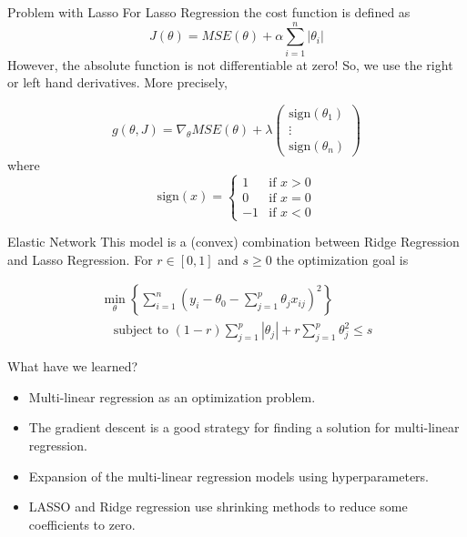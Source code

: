 \documentclass{beamer}
\begin{document}
\begin{frame}{Problem with Lasso}
For Lasso Regression the cost function is defined as
\begin{equation*}
	J(\theta)=MSE(\theta)+\alpha\sum_{i=1}^n |\theta_i|
\end{equation*}
However, the absolute function is not differentiable at zero! So, we use the right or left hand derivatives. More precisely,

\begin{equation*}
	g(\theta,J)= \nabla_\theta MSE (\theta)+ \lambda  
	\begin{pmatrix}
		\textrm{sign}(\theta_1)\\
		\vdots\\
		\textrm{sign}(\theta_n)
	\end{pmatrix}
\end{equation*}
where 
\begin{equation*}
	\textrm{sign}(x)= \begin{cases}
		1 & \textrm{if } x>0\\
		0 & \textrm{if } x=0\\
		-1 & \textrm{if  }x<0
	\end{cases}
\end{equation*}
\end{frame}

\begin{frame}{Elastic Network}
This model is a (convex) combination between Ridge Regression and Lasso Regression. For $r \in [0,1]$ and $s \ge 0$ the optimization goal is

\begin{equation*}
	\begin{split}
\min_{\theta} \left\{ \sum_{i=1}^n \left( y_i - \theta_0 - \sum_{j=1}^p \theta_j x_{ij} \right)^2 \right\}  \\
\quad\textrm{subject to }   (1-r)\sum_{j=1}^p |\theta_j | + r \sum_{j=1}^p \theta_j^2 \le s
	\end{split}
\end{equation*} 

\end{frame}

\begin{frame}{What have we learned?}
	\begin{itemize}
		\item Multi-linear regression as an optimization problem.
		\item The gradient descent is a good strategy for finding a solution for multi-linear regression.
		\item Expansion of the multi-linear regression models using hyperparameters. 
		\item LASSO and Ridge regression use shrinking methods to reduce some coefficients to zero.	
	\end{itemize}
\end{frame}
\end{document}
